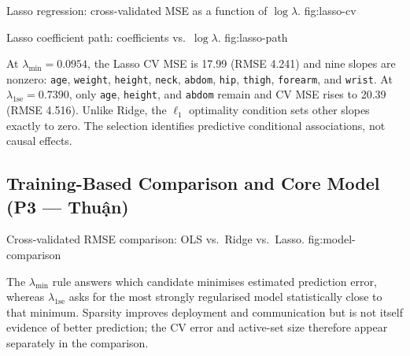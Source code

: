%
    {Lasso regression: cross-validated MSE as a function of $\log\lambda$.}%
    {fig:lasso-cv}

%
    {Lasso coefficient path: coefficients vs.\ $\log\lambda$.}%
    {fig:lasso-path}





At $\lambda_{\min}=0.0954$, the Lasso CV MSE is 17.99 (RMSE 4.241) and
nine slopes are nonzero: \texttt{age}, \texttt{weight}, \texttt{height},
\texttt{neck}, \texttt{abdom}, \texttt{hip}, \texttt{thigh},
\texttt{forearm}, and \texttt{wrist}.  At
$\lambda_{1\mathrm{se}}=0.7390$, only \texttt{age}, \texttt{height}, and
\texttt{abdom} remain and CV MSE rises to 20.39 (RMSE 4.516).  Unlike Ridge,
the $\ell_1$ optimality condition sets other slopes exactly to zero.  The
selection identifies predictive conditional associations, not causal effects.

\subsection{Training-Based Comparison and Core Model (P3 — Thuận)}
\label{sec:comparison}



%
    {Cross-validated RMSE comparison: OLS vs.\ Ridge vs.\ Lasso.}%
    {fig:model-comparison}

\bigskip
\noindent
{}

The $\lambda_{\min}$ rule answers which candidate minimises estimated
prediction error, whereas $\lambda_{1\mathrm{se}}$ asks for the most strongly
regularised model statistically close to that minimum.  Sparsity improves
deployment and communication but is not itself evidence of better prediction;
the CV error and active-set size therefore appear separately in the comparison.

